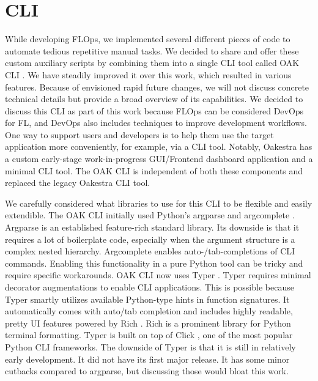 \section{CLI}

While developing FLOps, we implemented several different pieces of code to automate tedious repetitive manual tasks.
We decided to share and offer these custom auxiliary scripts by combining them into a single CLI tool called OAK CLI \cite{cli_code}.
We have steadily improved it over this work, which resulted in various features.
Because of envisioned rapid future changes, we will not discuss concrete technical details but provide a broad overview of its capabilities.
We decided to discuss this CLI as part of this work because FLOps can be considered DevOps for FL, and DevOps also includes techniques to improve development workflows.
One way to support users and developers is to help them use the target application more conveniently, for example, via a CLI tool.
Notably, Oakestra has a custom early-stage work-in-progress GUI/Frontend dashboard application \cite{oakestra_dashboard} and a minimal CLI tool.
The OAK CLI is independent of both these components and replaced the legacy Oakestra CLI tool.

We carefully considered what libraries to use for this CLI to be flexible and easily extendible.
The OAK CLI initially used Python's argparse \cite{python_argparse} and argcomplete \cite{python_argcomplete}.
Argparse is an established feature-rich standard library.
Its downside is that it requires a lot of boilerplate code, especially when the argument structure is a complex nested hierarchy.
Argcomplete enables auto-/tab-completions of CLI commands.
Enabling this functionality in a pure Python tool can be tricky and require specific workarounds.
OAK CLI now uses Typer \cite{typer}.
Typer requires minimal decorator augmentations to enable CLI applications.
This is possible because Typer smartly utilizes available Python-type hints in function signatures.
It automatically comes with auto/tab completion and includes highly readable, pretty UI features powered by Rich \cite{rich}.
Rich is a prominent library for Python terminal formatting.
Typer is built on top of Click \cite{click}, one of the most popular Python CLI frameworks.
The downside of Typer is that it is still in relatively early development.
It did not have its first major release.
It has some minor cutbacks compared to argparse, but discussing those would bloat this work.

